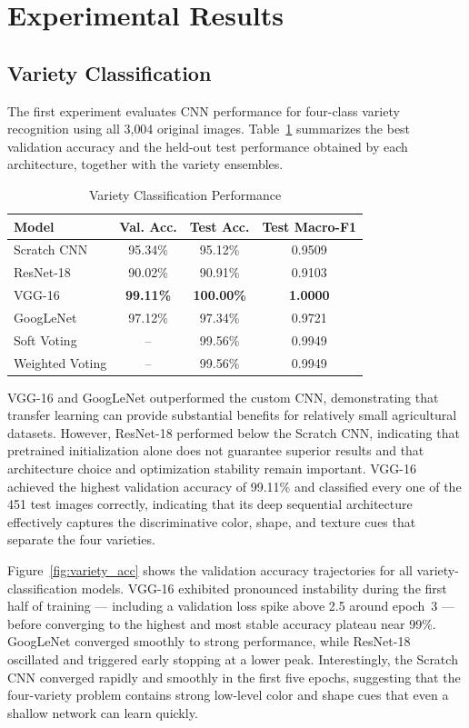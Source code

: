\documentclass[conference]{IEEEtran}
\begin{document}
\section{Experimental Results}
\subsection{Variety Classification}
The first experiment evaluates CNN performance for four-class variety recognition using all 3{,}004 original images. Table~\ref{tab:variety_results} summarizes the best validation accuracy and the held-out test performance obtained by each architecture, together with the variety ensembles.

\begin{table}[htbp]
\caption{Variety Classification Performance}
\begin{center}
\begin{tabular}{lccc}
\toprule
\textbf{Model} & \textbf{Val. Acc.} & \textbf{Test Acc.} & \textbf{Test Macro-F1} \\
\midrule
Scratch CNN & 95.34\% & 95.12\% & 0.9509 \\
ResNet-18 & 90.02\% & 90.91\% & 0.9103 \\
VGG-16 & \textbf{99.11\%} & \textbf{100.00\%} & \textbf{1.0000} \\
GoogLeNet & 97.12\% & 97.34\% & 0.9721 \\
\midrule
Soft Voting & -- & 99.56\% & 0.9949 \\
Weighted Voting & -- & 99.56\% & 0.9949 \\
\bottomrule
\end{tabular}
\label{tab:variety_results}
\end{center}
\end{table}

VGG-16 and GoogLeNet outperformed the custom CNN, demonstrating that transfer learning can provide substantial benefits for relatively small agricultural datasets. However, ResNet-18 performed below the Scratch CNN, indicating that pretrained initialization alone does not guarantee superior results and that architecture choice and optimization stability remain important. VGG-16 achieved the highest validation accuracy of 99.11\% and classified every one of the 451 test images correctly, indicating that its deep sequential architecture effectively captures the discriminative color, shape, and texture cues that separate the four varieties.

Figure~\ref{fig:variety_acc} shows the validation accuracy trajectories for all variety-classification models. VGG-16 exhibited pronounced instability during the first half of training --- including a validation loss spike above 2.5 around epoch~3 --- before converging to the highest and most stable accuracy plateau near 99\%. GoogLeNet converged smoothly to strong performance, while ResNet-18 oscillated and triggered early stopping at a lower peak. Interestingly, the Scratch CNN converged rapidly and smoothly in the first five epochs, suggesting that the four-variety problem contains strong low-level color and shape cues that even a shallow network can learn quickly.
\end{document}
